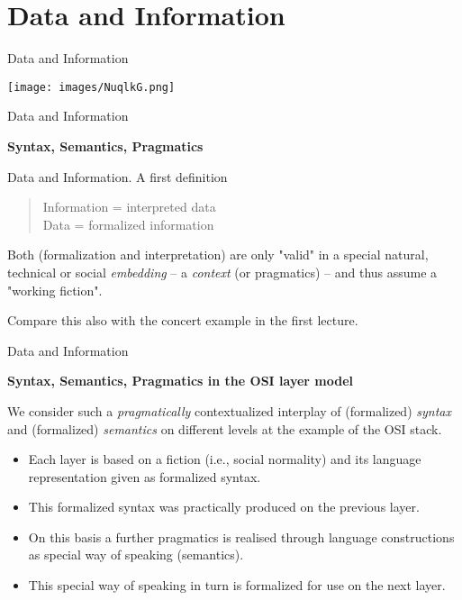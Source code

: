 \documentclass{beamer}
\newcommand{\ueberschrift}[1]{\begin{center}\bf #1\end{center}}
\begin{document}
\section{Data and Information}
\begin{frame}{Data and Information}

  \begin{center}
    \texttt{[image: images/NuqlkG.png]}
  \end{center}
\end{frame}

\begin{frame}{Data and Information}

  \ueberschrift{Syntax, Semantics, Pragmatics}
  
  \begin{block}{Data and Information. A first definition}
    \begin{quote}
      Information = interpreted data\\
      Data = formalized information
    \end{quote}
  \end{block}

Both (formalization and interpretation) are only "valid" in a special natural,
technical or social \emph{embedding} -- a \emph{context} (or pragmatics) --
and thus assume a "working fiction".

Compare this also with the concert example in the first lecture.
\vfill
\end{frame}
\begin{frame}{Data and Information}

  \ueberschrift{Syntax, Semantics, Pragmatics in the OSI layer model}

We consider such a \emph{pragmatically} contextualized interplay of
(formalized) \emph{syntax} and (formalized) \emph{semantics} on different
levels at the example of the OSI stack.

\begin{itemize}
\item Each layer is based on a fiction (i.e., social normality) and its
  language representation given as formalized syntax. 
\item This formalized syntax was practically produced on the previous layer.
\item On this basis a further pragmatics is realised through language
  constructions as special way of speaking (semantics).  
\item This special way of speaking in turn is formalized for use on the next
  layer.
\end{itemize}
\end{frame}
\end{document}
